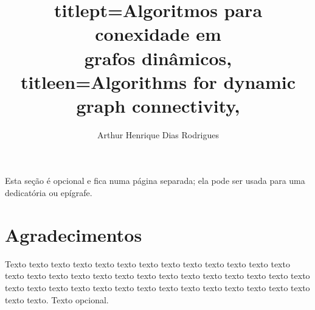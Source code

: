 \documentclass[12pt,twoside,english,brazilian]{book}
\title{
    titlept={Algoritmos para conexidade em\\ grafos dinâmicos},
    titleen={Algorithms for dynamic graph connectivity},
}
\author{Arthur Henrique Dias Rodrigues}
\begin{document}

\frontmatter

\pagestyle{plain}

\onehalfspacing %

\maketitle %


\begin{dedicatoria}
Esta seção é opcional e fica numa página separada; ela pode ser usada para
uma dedicatória ou epígrafe.
\end{dedicatoria}


\chapter*{Agradecimentos}

Texto texto texto texto texto texto texto texto texto texto texto texto texto
texto texto texto texto texto texto texto texto texto texto texto texto texto
texto texto texto texto texto texto texto texto texto texto texto texto texto
texto texto texto texto. Texto opcional.




\end{document}
